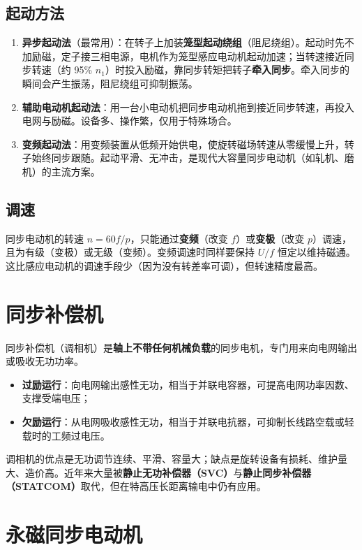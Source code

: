 \subsection{起动方法}
\begin{enumerate}
  \item \textbf{异步起动法}（最常用）：在转子上加装\textbf{笼型起动绕组}（阻尼绕组）。起动时先不加励磁，定子接三相电源，电机作为笼型感应电动机起动加速；当转速接近同步转速（约 95\% $n_1$）时投入励磁，靠同步转矩把转子\textbf{牵入同步}。牵入同步的瞬间会产生振荡，阻尼绕组可抑制振荡。
  \item \textbf{辅助电动机起动法}：用一台小电动机把同步电动机拖到接近同步转速，再投入电网与励磁。设备多、操作繁，仅用于特殊场合。
  \item \textbf{变频起动法}：用变频装置从低频开始供电，使旋转磁场转速从零缓慢上升，转子始终同步跟随。起动平滑、无冲击，是现代大容量同步电动机（如轧机、磨机）的主流方案。
\end{enumerate}

\subsection{调速}
同步电动机的转速 $n=60f/p$，只能通过\textbf{变频}（改变 $f$）或\textbf{变极}（改变 $p$）调速，且为有级（变极）或无级（变频）。变频调速时同样要保持 $U/f$ 恒定以维持磁通。这比感应电动机的调速手段少（因为没有转差率可调），但转速精度最高。

\section{同步补偿机}

同步补偿机（调相机）是\textbf{轴上不带任何机械负载}的同步电机，专门用来向电网输出或吸收无功功率。

\begin{itemize}
  \item \textbf{过励运行}：向电网输出感性无功，相当于并联电容器，可提高电网功率因数、支撑受端电压；
  \item \textbf{欠励运行}：从电网吸收感性无功，相当于并联电抗器，可抑制长线路空载或轻载时的工频过电压。
\end{itemize}
调相机的优点是无功调节连续、平滑、容量大；缺点是旋转设备有损耗、维护量大、造价高。近年来大量被\textbf{静止无功补偿器（SVC）}与\textbf{静止同步补偿器（STATCOM）}取代，但在特高压长距离输电中仍有应用。

\section{永磁同步电动机}


